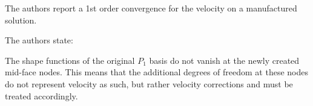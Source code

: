 The authors report a 1st order convergence for the velocity on a manufactured solution.

The authors state:
\begin{displayquote}
{\color{darkgray}
The shape functions of the original $P_1$ basis do not vanish at the newly created mid-face nodes.
This means that the additional degrees of freedom at these nodes do not represent velocity as
such, but rather velocity corrections and must be treated accordingly.
}
\end{displayquote}


